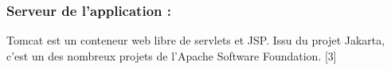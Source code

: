 \documentclass{article}
\begin{document}
{\subsubsection{Serveur de l'application : }
\begin{minipage}{0.15\textwidth}
	\begin{minipage}{\linewidth}
	\end{minipage}
\end{minipage}
\hfill
\begin{minipage}{0.75\textwidth}
\vspace{0.5cm}
Tomcat est un conteneur web libre de servlets et JSP. Issu du projet Jakarta, c'est
un des nombreux projets de l'Apache Software Foundation. [3]\\
\end{minipage}\\

}
\end{document}
